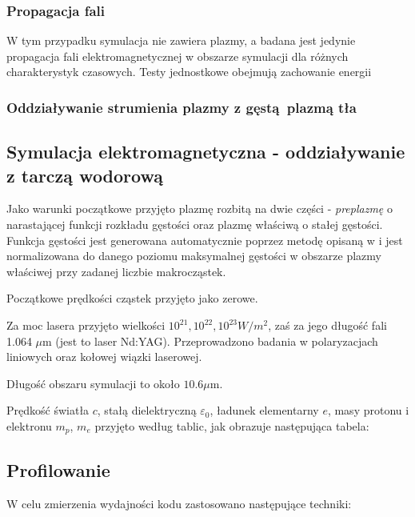 \subsubsection{Propagacja fali}
W tym przypadku symulacja nie zawiera plazmy, a badana jest jedynie propagacja fali elektromagnetycznej w obszarze
symulacji dla różnych charakterystyk czasowych. %
Testy jednostkowe obejmują zachowanie energii %

\subsubsection{Oddziaływanie strumienia plazmy z gęstą plazmą tła}

    \subsection{Symulacja elektromagnetyczna - oddziaływanie z tarczą wodorową}

    Jako warunki początkowe przyjęto plazmę rozbitą na dwie części - \emph{preplazmę} o narastającej funkcji rozkładu
    gęstości oraz plazmę właściwą o stałej gęstości. Funkcja gęstości jest generowana automatycznie poprzez metodę opisaną
    w %
    i jest normalizowana do danego poziomu maksymalnej gęstości w obszarze plazmy właściwej przy zadanej liczbie makrocząstek.

    Początkowe prędkości cząstek przyjęto jako zerowe.

    Za moc lasera przyjęto wielkości $10^{21}, 10^{22}, 10^{23} W/m^2$,
    zaś za jego długość fali 1.064 $\mu$m (jest to laser Nd:YAG). Przeprowadzono badania w polaryzacjach liniowych oraz
    kołowej wiązki laserowej.

    Długość obszaru symulacji to około $10.6 \mu$m.

    Prędkość światła $c$, stałą dielektryczną $\varepsilon_0$, ładunek
    elementarny $e$, masy protonu i elektronu $m_p$, $m_e$ przyjęto według
    tablic, jak obrazuje następująca tabela:


    \subsection{Profilowanie}
    W celu zmierzenia wydajności kodu zastosowano następujące techniki:
